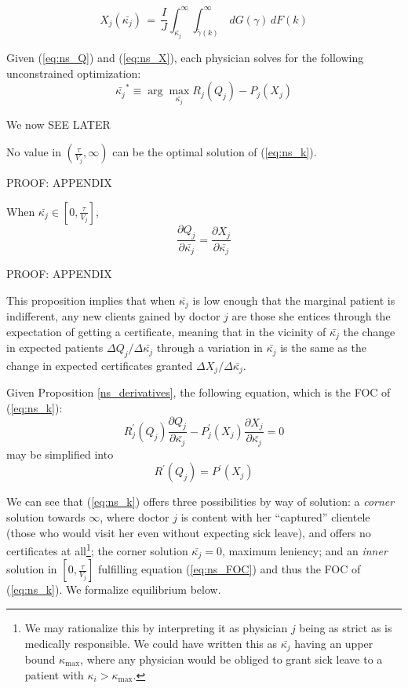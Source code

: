 \documentclass[../main.tex]{subfiles}
\begin{document}
\begin{equation}
    X_j(\bar{\kappa_j}) \,=\, \frac{I}{J} \int_{\bar{\kappa_j}}^{\infty} \int_{\tilde{\gamma}(k)}^{\infty} \,dG(\gamma) \,dF(k)
    \tag{N.2}\label{eq:ns_X}
\end{equation}

Given (\ref{eq:ns_Q}) and (\ref{eq:ns_X}), each physician solves for the following unconstrained optimization:
\begin{equation}
\bar{\kappa_j}^* \equiv \operatorname{arg}\max_{\bar{\kappa_j}} R_j(Q_j) - P_j(X_j)
\tag{N.3}\label{eq:ns_k}
\end{equation}

We now SEE LATER

\begin{lemma}
\label{ns_lemma}
No value in $(\frac{\tau}{V_j},\infty)$ can be the optimal solution of (\ref{eq:ns_k}).
\end{lemma}

PROOF: APPENDIX

\begin{lemma}
    \label{ns_derivatives}
When $\bar{\kappa_j} \in [0,\frac{\tau}{V_j}]$,
\[
    \frac{\partial Q_j}{\partial\bar{\kappa_j}} = \frac{\partial X_j}{\partial \bar{\kappa_j}}   
\]
\end{lemma}

PROOF: APPENDIX

This proposition implies that when $\bar{\kappa_j}$ is low enough that the marginal patient is indifferent, any new clients gained by doctor $j$ are those she entices through the expectation of getting a certificate, meaning that in the vicinity of $\bar{\kappa_j}$ the change in expected patients $\Delta Q_j/\Delta\bar{\kappa_j}$ through a variation in $\bar{\kappa_j}$ is the same as the change in expected certificates granted $\Delta X_j/\Delta \bar{\kappa_j}$.

Given Proposition \ref{ns_derivatives}, the following equation, which is the FOC of (\ref{eq:ns_k}):
\[
R_j^{\prime}(Q_j)\frac{\partial Q_j}{\partial\bar{\kappa_j}}  - P_j^{\prime}(X_j)\frac{\partial X_j}{\partial \bar{\kappa_j}} = 0
\]
may be simplified into
\begin{equation}
    R^{\prime}(Q_j) = P^{\prime}(X_j)
    \tag{N.4}\label{eq:ns_FOC}
\end{equation}

We can see that (\ref{eq:ns_k}) offers three possibilities by way of solution: a \textit{corner} solution towards $\infty$, where doctor $j$ is content with her ``captured'' clientele (those who would visit her even without expecting sick leave), and offers no certificates at all\footnote{We may rationalize this by interpreting it as physician $j$ being as strict as is medically responsible. We could have written this as $\bar{\kappa_j}$ having an upper bound $\kappa_{\operatorname{max}}$, where any physician would be obliged to grant sick leave to a patient with $\kappa_i > \kappa_{\operatorname{max}}$.}; the corner solution $\bar{\kappa_j} = 0$, maximum leniency; and an \textit{inner} solution in $[0,\frac{\tau}{V_j}]$ fulfilling equation (\ref{eq:ns_FOC}) and thus the FOC of (\ref{eq:ns_k}). We formalize equilibrium below.
\end{document}
